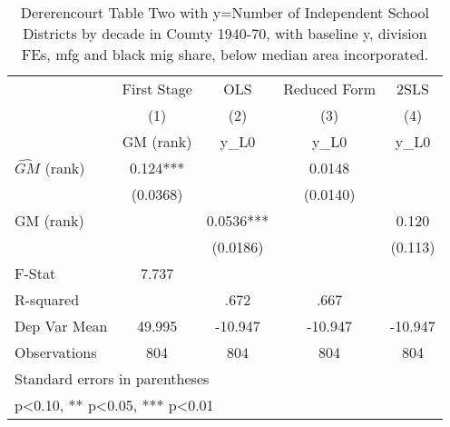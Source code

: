 \begin{table}[htbp]\centering
\def\sym#1{\ifmmode^{#1}\else\(^{#1}\)\fi}
\caption{Dererencourt Table Two with y=Number of Independent School Districts by decade in County 1940-70, with baseline y, division FEs, mfg and black mig share, below median area incorporated.}
\begin{tabular}{l*{4}{c}}
\toprule
                    & First Stage   &         OLS   &Reduced Form   &        2SLS   \\
                    &\multicolumn{1}{c}{(1)}&\multicolumn{1}{c}{(2)}&\multicolumn{1}{c}{(3)}&\multicolumn{1}{c}{(4)}\\
                    &\multicolumn{1}{c}{GM  (rank)}&\multicolumn{1}{c}{y\_L0}&\multicolumn{1}{c}{y\_L0}&\multicolumn{1}{c}{y\_L0}\\
\midrule
$\hat{GM}$ (rank)   &       0.124***&               &      0.0148   &               \\
                    &    (0.0368)   &               &    (0.0140)   &               \\
\addlinespace
GM  (rank)          &               &      0.0536***&               &       0.120   \\
                    &               &    (0.0186)   &               &     (0.113)   \\
\midrule
F-Stat              &       7.737   &               &               &               \\
R-squared           &               &        .672   &        .667   &               \\
Dep Var Mean        &      49.995   &     -10.947   &     -10.947   &     -10.947   \\
Observations        &         804   &         804   &         804   &         804   \\
\bottomrule
\multicolumn{5}{l}{\footnotesize Standard errors in parentheses}\\
\multicolumn{5}{l}{\footnotesize * p<0.10, ** p<0.05, *** p<0.01}\\
\end{tabular}
\end{table}
